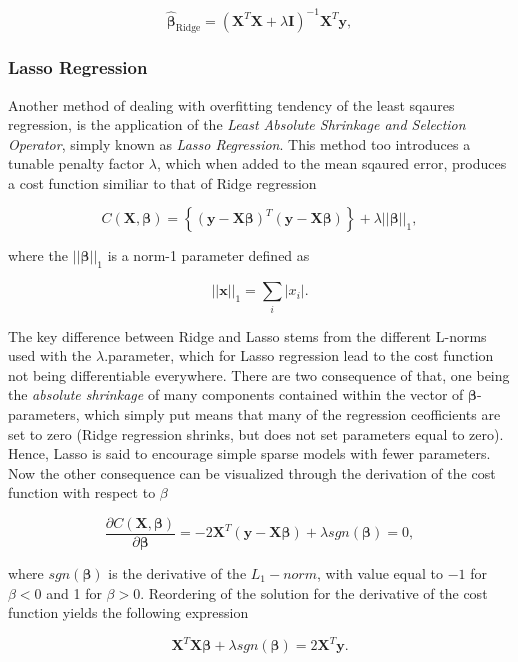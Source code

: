 \documentclass[a4paper, 10pt]{article}
\begin{document}
$$
\hat{\boldsymbol{\beta}}_{\mathrm{Ridge}} = \left(\boldsymbol{X}^T\boldsymbol{X}+\lambda\boldsymbol{I}\right)^{-1}\boldsymbol{X}^T\boldsymbol{y},
$$


\subsubsection{Lasso Regression}
Another method of dealing with overfitting tendency of the least sqaures regression, is the application of the \emph{Least Absolute Shrinkage and Selection Operator}, simply known as \emph{Lasso Regression}. This method too introduces a tunable penalty factor $\lambda$, which when added to the mean sqaured error, produces a cost function similiar to that of Ridge regression 

$$
C(\boldsymbol{X},\boldsymbol{\beta})=\left\{(\boldsymbol{y}-\boldsymbol{X}\boldsymbol{\beta})^T(\boldsymbol{y}-\boldsymbol{X}\boldsymbol{\beta})\right\}+\lambda\vert\vert\boldsymbol{\beta}\vert\vert_1,
$$

where the $\vert\vert\boldsymbol{\beta}\vert\vert_1$ is a norm-1 parameter defined as

$$
\vert\vert \boldsymbol{x}\vert\vert_1 = \sum_i \vert x_i\vert.
$$

The key difference between Ridge and Lasso stems from the different L-norms used with the $\lambda$.parameter, which for Lasso regression lead to the cost function not being differentiable everywhere. There are two consequence of that, one being the \emph{absolute shrinkage} of many components contained within the vector of $\boldsymbol{\beta}$-parameters, which simply put means that many of the regression ceofficients are set to zero (Ridge regression shrinks, but does not set parameters equal to zero). Hence, Lasso is said to encourage simple sparse models with fewer parameters. Now the other consequence can be visualized through the derivation of the cost function with respect to $\beta$ 

$$
\frac{\partial C(\boldsymbol{X},\boldsymbol{\beta})}{\partial \boldsymbol{\beta}}=-2\boldsymbol{X}^T(\boldsymbol{y}-\boldsymbol{X}\boldsymbol{\beta})+\lambda sgn(\boldsymbol{\beta})=0,
$$

where $sgn(\boldsymbol{\beta})$ is the derivative of the $L_1-norm$, with value equal to $-1$ for $\beta < 0$ and 1 for $\beta > 0$. Reordering of the solution for the derivative of the cost function yields the following expression 

$$
\boldsymbol{X}^T\boldsymbol{X}\boldsymbol{\beta}+\lambda sgn(\boldsymbol{\beta})=2\boldsymbol{X}^T\boldsymbol{y}.
$$
\end{document}
